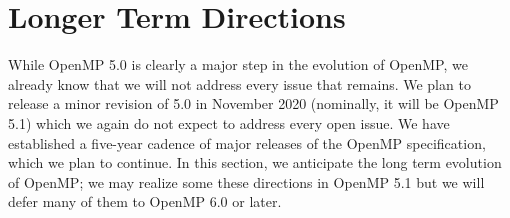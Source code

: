 \section{Longer Term Directions}
\label{sec:future_directions}

While OpenMP 5.0 is clearly a major step in the evolution of OpenMP,
we already know that we will not address every issue that remains.
We plan to release a minor revision of 5.0 in November 2020 (nominally,
it will be OpenMP 5.1) which we again do not expect to address every
open issue. We have established a five-year cadence of major releases 
of the OpenMP specification, which we plan to continue. In this section, 
we anticipate the long term evolution of OpenMP; we may realize some these 
directions in OpenMP 5.1 but we will defer many of them to OpenMP 6.0 
or later. 










